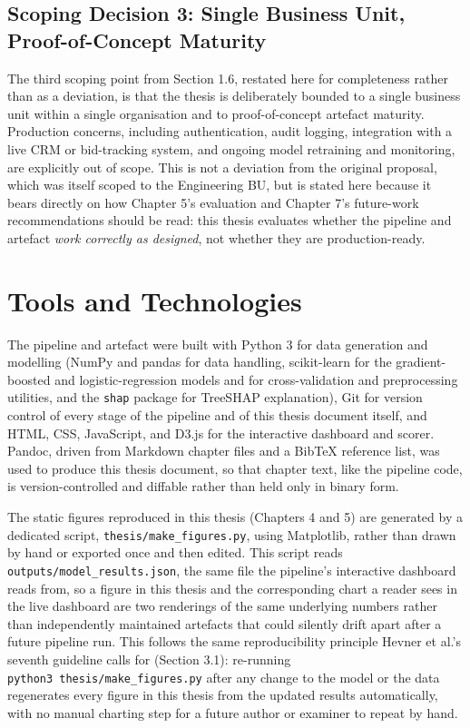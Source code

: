\hypertarget{scoping-decision-3-single-business-unit-proof-of-concept-maturity}{%
\subsection{Scoping Decision 3: Single Business Unit, Proof-of-Concept
Maturity}\label{scoping-decision-3-single-business-unit-proof-of-concept-maturity}}

The third scoping point from Section 1.6, restated here for completeness
rather than as a deviation, is that the thesis is deliberately bounded
to a single business unit within a single organisation and to
proof-of-concept artefact maturity. Production concerns, including
authentication, audit logging, integration with a live CRM or
bid-tracking system, and ongoing model retraining and monitoring, are
explicitly out of scope. This is not a deviation from the original
proposal, which was itself scoped to the Engineering BU, but is stated
here because it bears directly on how Chapter 5's evaluation and Chapter
7's future-work recommendations should be read: this thesis evaluates
whether the pipeline and artefact \emph{work correctly as designed}, not
whether they are production-ready.

\hypertarget{tools-and-technologies}{%
\section{Tools and Technologies}\label{tools-and-technologies}}

The pipeline and artefact were built with Python 3 for data generation
and modelling (NumPy and pandas for data handling, scikit-learn for the
gradient-boosted and logistic-regression models and for cross-validation
and preprocessing utilities, and the \texttt{shap} package for TreeSHAP
explanation), Git for version control of every stage of the pipeline and
of this thesis document itself, and HTML, CSS, JavaScript, and D3.js for
the interactive dashboard and scorer. Pandoc, driven from Markdown
chapter files and a BibTeX reference list, was used to produce this
thesis document, so that chapter text, like the pipeline code, is
version-controlled and diffable rather than held only in binary form.

The static figures reproduced in this thesis (Chapters 4 and 5) are
generated by a dedicated script, \texttt{thesis/make\_figures.py}, using
Matplotlib, rather than drawn by hand or exported once and then edited.
This script reads \texttt{outputs/model\_results.json}, the same file
the pipeline's interactive dashboard reads from, so a figure in this
thesis and the corresponding chart a reader sees in the live dashboard
are two renderings of the same underlying numbers rather than
independently maintained artefacts that could silently drift apart after
a future pipeline run. This follows the same reproducibility principle
Hevner et al.'s \citeyearpar{hevner2004design} seventh guideline calls
for (Section 3.1): re-running \texttt{python3\ thesis/make\_figures.py}
after any change to the model or the data regenerates every figure in
this thesis from the updated results automatically, with no manual
charting step for a future author or examiner to repeat by hand.

